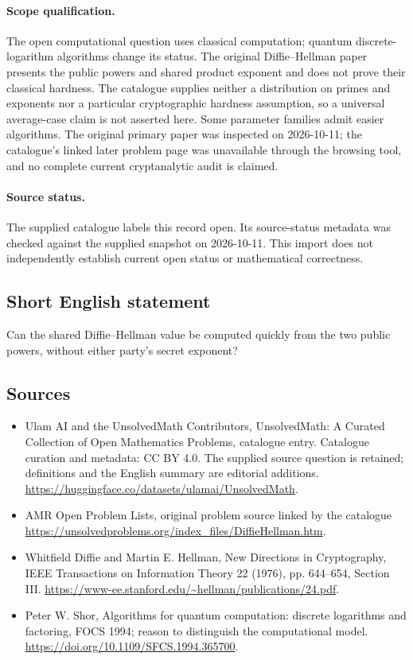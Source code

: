 \documentclass[11pt]{article}
\begin{document}
\paragraph{Scope qualification.}
The open computational question uses classical computation; quantum discrete-logarithm algorithms change its status. The original Diffie--Hellman paper presents the public powers and shared product exponent and does not prove their classical hardness. The catalogue supplies neither a distribution on primes and exponents nor a particular cryptographic hardness assumption, so a universal average-case claim is not asserted here. Some parameter families admit easier algorithms. The original primary paper was inspected on 2026-10-11; the catalogue's linked later problem page was unavailable through the browsing tool, and no complete current cryptanalytic audit is claimed.
\paragraph{Source status.}
The supplied catalogue labels this record open. Its source-status metadata was checked against the supplied snapshot on 2026-10-11. This import does not independently establish current open status or mathematical correctness.
\subsection{Short English statement}
Can the shared Diffie--Hellman value be computed quickly from the two public powers, without either party's secret exponent?
\subsection{Sources}
\begin{itemize}
\item[S1] Ulam AI and the UnsolvedMath Contributors, UnsolvedMath: A Curated Collection of Open Mathematics Problems, catalogue entry. Catalogue curation and metadata: CC BY 4.0. The supplied source question is retained; definitions and the English summary are editorial additions.
\url{https://huggingface.co/datasets/ulamai/UnsolvedMath}.
\item[S2] AMR Open Problem Lists, original problem source linked by the catalogue
\url{https://unsolvedproblems.org/index_files/DiffieHellman.htm}.
\item[S3] Whitfield Diffie and Martin E. Hellman, New Directions in Cryptography, IEEE Transactions on Information Theory 22 (1976), pp. 644--654, Section III.
\url{https://www-ee.stanford.edu/~hellman/publications/24.pdf}.
\item[S4] Peter W. Shor, Algorithms for quantum computation: discrete logarithms and factoring, FOCS 1994; reason to distinguish the computational model.
\url{https://doi.org/10.1109/SFCS.1994.365700}.
\end{itemize}
\end{document}
